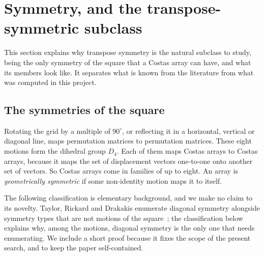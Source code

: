 \documentclass[11pt,a4paper,oneside]{report}
\theoremstyle{definition}
\begin{document}
\section{Symmetry, and the transpose-symmetric subclass}\label{p8-sec:symmetry}
This section explains why transpose symmetry is the natural subclass to study, being the only symmetry of the square that a Costas array can have, and what its members look like. It separates what is known from the literature from what was computed in this project.


\subsection{The symmetries of the square}

Rotating the grid by a multiple of $90^\circ$, or reflecting it in a horizontal, vertical or
diagonal line, maps permutation matrices to permutation matrices. These eight motions form
the dihedral group $D_4$. Each of them maps Costas arrays to Costas arrays, because it maps
the set of displacement vectors one-to-one onto another set of vectors. So Costas arrays come
in families of up to eight. An array is \emph{geometrically symmetric} if some non-identity motion maps it
to itself.

The following classification is elementary background, and we make no claim to its novelty.
Taylor, Rickard and Drakakis enumerate diagonal symmetry alongside symmetry types that are not
motions of the square~\cite{p8-taylor2009}; the classification below explains why, among the motions,
diagonal symmetry is the only one that needs enumerating. We include a short proof because it fixes the scope of the present search, and to keep
the paper self-contained.
\end{document}
